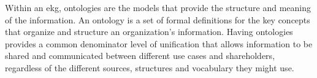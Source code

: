 %
%
Within an \gls{ekg}, ontologies are the models that provide the structure and meaning of the information.
An ontology is a set of formal definitions for the key concepts that organize and structure an
organization’s information.
Having ontologies provides a common denominator level of unification that allows information to be shared and
communicated between different use cases and shareholders, regardless of the different sources,
structures and vocabulary they might use.
